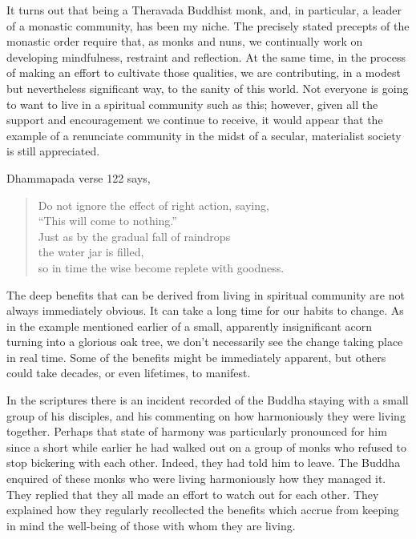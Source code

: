 It turns out that being a Theravada Buddhist monk, and, in particular, a
leader of a monastic community, has been my niche. The precisely stated
precepts of the monastic order require that, as monks and nuns, we
continually work on developing mindfulness, restraint and reflection. At
the same time, in the process of making an effort to cultivate those
qualities, we are contributing, in a modest but nevertheless significant
way, to the sanity of this world. Not everyone is going to want to live
in a spiritual community such as this; however, given all the support
and encouragement we continue to receive, it would appear that the
example of a renunciate community in the midst of a secular, materialist
society is still appreciated.

Dhammapada verse 122 says,

\begin{quote}
  Do not ignore the effect of right action, saying,\\
  ``This will come to nothing.''\\
  Just as by the gradual fall of raindrops\\
  the water jar is filled,\\
  so in time the wise become replete with goodness.
\end{quote}

The deep benefits that can be derived from living in spiritual community
are not always immediately obvious. It can take a long time for our
habits to change. As in the example mentioned earlier of a small,
apparently insignificant acorn turning into a glorious oak tree, we
don't necessarily see the change taking place in real time. Some of the
benefits might be immediately apparent, but others could take decades,
or even lifetimes, to manifest.

In the scriptures there is an incident recorded of the Buddha staying
with a small group of his disciples, and his commenting on how
harmoniously they were living together. Perhaps that state of harmony
was particularly pronounced for him since a short while earlier he had
walked out on a group of monks who refused to stop bickering with each
other. Indeed, they had told him to leave. The Buddha enquired of these
monks who were living harmoniously how they managed it. They replied
that they all made an effort to watch out for each other. They explained
how they regularly recollected the benefits which accrue from keeping in
mind the well-being of those with whom they are living.

